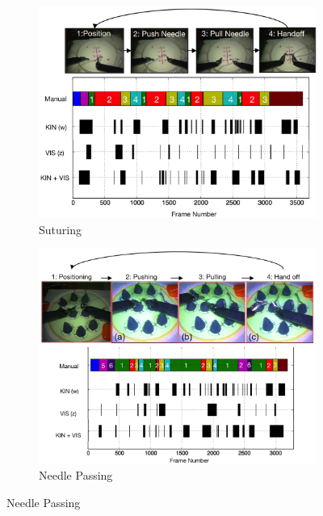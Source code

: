 \begin{figure}[!ht]
	\centering
	\begin{subfigure}[t]{3.4in}
	    \centering
        \includegraphics[width=\linewidth]{figures/suturing}
		\caption{Suturing}
		\label{fig:suturing}
		\vspace{-5pt}
	\end{subfigure}
	 \hspace{0.1in}
	\begin{subfigure}[t]{3.4in}
	    \centering
		\includegraphics[width=\linewidth]{figures/needle_passing}
		\caption{Needle Passing}
		\label{fig:needlePassing}
		\vspace{-5pt}
	\end{subfigure}

\end{figure}
